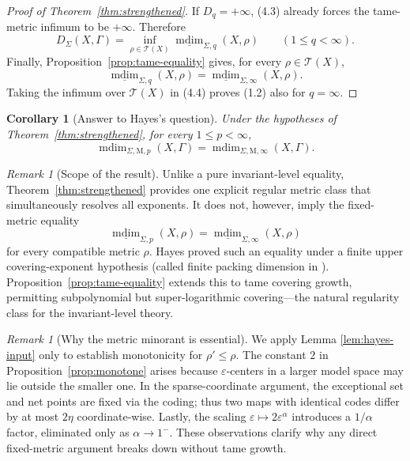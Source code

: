 \documentclass[12pt]{amsart}
\newtheorem{corollary}[theorem]{Corollary}
\theoremstyle{definition}
\theoremstyle{remark}
\newtheorem{remark}[theorem]{Remark}
\newcommand{\mdim}{\operatorname{mdim}}
\begin{document}
\begin{proof}[Proof of Theorem~\ref{thm:strengthened}]
If $D_q=+\infty$, (4.3) already forces the tame-metric infimum to be $+\infty$. Therefore
\[
 D_\Sigma(X,\Gamma)
 =\inf_{\rho\in\mathcal T(X)}
 \underline{\mdim}_{\Sigma,q}(X,\rho)
 \qquad(1\leq q<\infty).
 \tag{4.4}
\]
Finally, Proposition~\ref{prop:tame-equality} gives, for every $\rho\in\mathcal T(X)$,
\[
 \underline{\mdim}_{\Sigma,q}(X,\rho)
 =\underline{\mdim}_{\Sigma,\infty}(X,\rho).
\]
Taking the infimum over $\mathcal T(X)$ in (4.4) proves (1.2) also for $q=\infty$.
\end{proof}

\begin{corollary}[Answer to Hayes's question]\label{thm:main}
Under the hypotheses of Theorem~\ref{thm:strengthened}, for every $1\leq p<\infty$,
\[
 \mdim_{\Sigma,\mathrm M,p}(X,\Gamma)
 =\mdim_{\Sigma,\mathrm M,\infty}(X,\Gamma).
\]
\end{corollary}

\begin{remark}[Scope of the result]\label{rem:fixed}
Unlike a pure invariant-level equality, Theorem~\ref{thm:strengthened} 
provides one explicit regular metric class that simultaneously resolves all 
exponents.  It does not, however, imply the fixed-metric equality
\[
 \underline{\mdim}_{\Sigma,p}(X,\rho)
 =\underline{\mdim}_{\Sigma,\infty}(X,\rho)
\]
for every compatible metric $\rho$.  Hayes proved such an equality under a finite 
upper covering-exponent hypothesis (called finite packing dimension in 
\cite[Proposition~2.20]{Hayes}).  Proposition~\ref{prop:tame-equality} 
extends this to tame covering growth, permitting subpolynomial but 
super-logarithmic covering---the natural regularity class for the 
invariant-level theory.
\end{remark}

\begin{remark}[Why the metric minorant is essential]
We apply Lemma \ref{lem:hayes-input} only to establish monotonicity 
for $\rho'\le\rho$.  The constant $2$ in Proposition~\ref{prop:monotone} 
arises because $\varepsilon$-centers in a larger model space may lie 
outside the smaller one.  In the sparse-coordinate argument, the exceptional 
set and net points are fixed via the coding; thus two maps with identical 
codes differ by at most $2\eta$ coordinate-wise.  Lastly, the scaling 
$\varepsilon\mapsto2\varepsilon^\alpha$ introduces a $1/\alpha$ factor, 
eliminated only as $\alpha\to1^{-}$.  These observations clarify why any 
direct fixed-metric argument breaks down without tame growth.
\end{remark}
\end{document}

